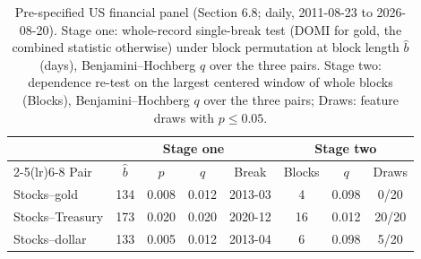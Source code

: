\begin{table}[!t]
\centering
\caption{Pre-specified US financial panel (Section 6.8; daily, 2011-08-23 to 2026-08-20). Stage one: whole-record single-break test (DOMI for gold, the combined statistic otherwise) under block permutation at block length $\hat b$ (days), Benjamini--Hochberg $q$ over the three pairs. Stage two: dependence re-test on the largest centered window of whole blocks (Blocks), Benjamini--Hochberg $q$ over the three pairs; Draws: feature draws with $p\le0.05$.}
\footnotesize
\setlength{\tabcolsep}{2pt}
\begin{tabular}{l ccc cccc}
\toprule
 & \multicolumn{4}{c}{Stage one} & \multicolumn{3}{c}{Stage two} \\
\cmidrule(lr){2-5}\cmidrule(lr){6-8}
Pair & $\hat b$ & $p$ & $q$ & Break & Blocks & $q$ & Draws \\
\midrule
Stocks--gold & 134 & 0.008 & 0.012 & 2013-03 & 4 & 0.098 & 0/20 \\
Stocks--Treasury & 173 & 0.020 & 0.020 & 2020-12 & 16 & 0.012 & 20/20 \\
Stocks--dollar & 133 & 0.005 & 0.012 & 2013-04 & 6 & 0.098 & 5/20 \\
\bottomrule
\end{tabular}
\label{tab:fin}
\end{table}
